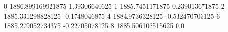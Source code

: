 0 1886.899169921875 1.39306640625
1 1885.7451171875 0.239013671875
2 1885.331298828125 -0.1748046875
4 1884.9736328125 -0.532470703125
6 1885.279052734375 -0.22705078125
8 1885.506103515625 0.0
